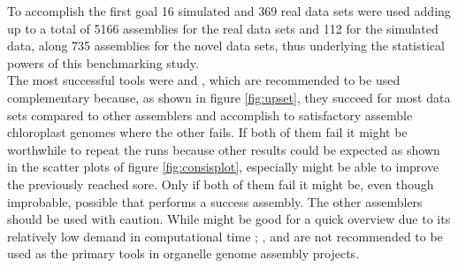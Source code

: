 To accomplish the first goal 16 simulated and 369 real data sets were used adding up to a
total of 5166 assemblies for the real data sets and 112 for the simulated data, along 735
assemblies for the novel data sets, thus underlying the statistical powers of this
benchmarking study.\\
The most successful tools were \go \hspace{0.25ex} and \fp, which are recommended to be
used complementary because, as shown in figure \ref{fig:upset}, they succeed for most data
sets compared to other assemblers and accomplish to satisfactory assemble chloroplast
genomes where the other fails. If both of them fail it might be worthwhile to repeat the
runs because other results could be expected as shown in the scatter plots of figure
\ref{fig:consisplot}, especially \fp \hspace{0.25ex} might be able to improve the
previously reached sore. Only if both of them fail it might be, even though improbable,
possible that \np \hspace{0.25ex} performs a success assembly. The other
assemblers should be used with caution. While \ce \hspace{0.25ex} might be good for a
quick overview due to its relatively low demand in computational time
\cite{freudenthal2019landscape}; \cassp, \oa \hspace{0.25ex} and \ioga \hspace{0.25ex} are
not recommended to be used as the primary tools in organelle genome assembly projects.

